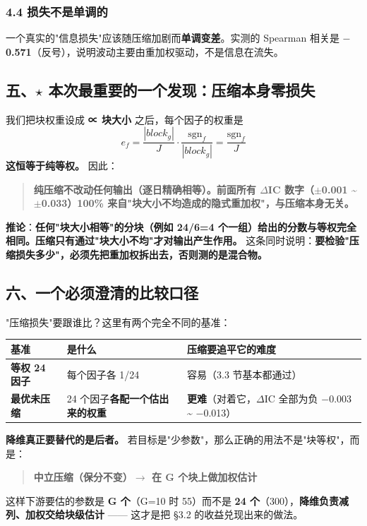 \documentclass[11pt]{article}
\begin{document}
\subsubsection{\texorpdfstring{4.4 损失不是单调的}{4.4 损失不是单调的}}
一个真实的"信息损失"应该随压缩加剧而\textbf{单调变差}。实测的 Spearman 相关是 \textbf{\ensuremath{-}0.571}（反号），说明波动主要由重加权驱动，不是信息在流失。
\subsection{\texorpdfstring{五、$\star$ 本次最重要的一个发现：压缩本身零损失}{五、★ 本次最重要的一个发现：压缩本身零损失}}
我们把块权重设成 \textbf{∝ 块大小} 之后，每个因子的权重是
\[
e_f=\frac{|block_g|}{J}\cdot\frac{\mathrm{sgn}_f}{|block_g|}=\frac{\mathrm{sgn}_f}{J}
\]
\textbf{这恒等于纯等权。} 因此：
\begin{quote}
\textbf{纯压缩不改动任何输出（逐日精确相等）。前面所有 \ensuremath{\Delta}IC 数字（\ensuremath{\pm}0.001 \textasciitilde{} \ensuremath{\pm}0.033）100\% 来自"块大小不均造成的隐式重加权"，与压缩本身无关。}
\end{quote}
\textbf{推论}：\textbf{任何"块大小相等"的分块（例如 24/6=4 个一组）给出的分数与等权完全相同。压缩只有通过"块大小不均"才对输出产生作用。}
这条同时说明：\textbf{要检验"压缩损失多少"，必须先把重加权拆出去，否则测的是混合物。}
\subsection{\texorpdfstring{六、一个必须澄清的比较口径}{六、一个必须澄清的比较口径}}
"压缩损失"要跟谁比？这里有两个完全不同的基准：
{\small
\begin{longtable}{p{2.62cm}p{5.40cm}p{8.18cm}}
\toprule
基准 & 是什么 & 压缩要追平它的难度 \\
\midrule
\textbf{等权 24 因子} & 每个因子各 1/24 & 容易（3.3 节基本都通过） \\
\textbf{最优未压缩} & 24 个因子\textbf{各配一个估出来的权重} & \textbf{更难}（对着它，\ensuremath{\Delta}IC 全部为负 \ensuremath{-}0.003 \textasciitilde{} \ensuremath{-}0.013） \\
\bottomrule
\end{longtable}
}
\textbf{降维真正要替代的是后者。} 若目标是"少参数"，那么正确的用法不是"块等权"，而是：
\begin{quote}
\textbf{中立压缩（保分不变）\ensuremath{\rightarrow} 在 G 个块上做加权估计}
\end{quote}
这样下游要估的参数是 \textbf{G 个}（G=10 时 55）而不是 \textbf{24 个}（300），\textbf{降维负责减列、加权交给块级估计} ------ 这才是把 \S{}3.2 的收益兑现出来的做法。
\end{document}
